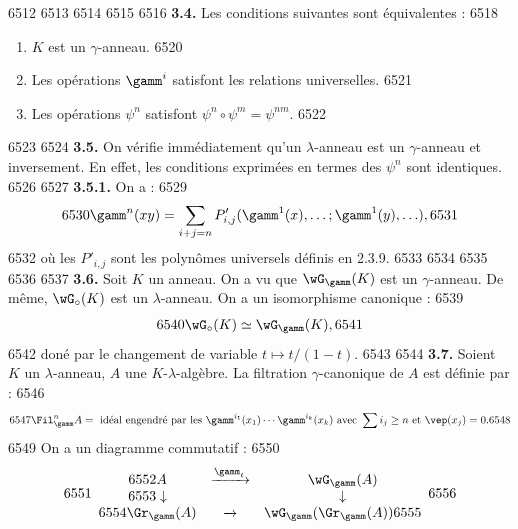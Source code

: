   6512	
  6513	%
  6514	%
  6515	%
  6516		\noindent\textbf{3.4.} Les conditions suivantes sont \'equivalentes :
  6518	\begin{enumerate}
  6519	\item $K$ est un $\gamma$-anneau.
  6520	\item Les op\'erations $\gamm^i$ satisfont les relations universelles.
  6521	\item Les op\'erations $\psi^n$ satisfont $\psi^n \circ \psi^m = \psi^{nm}$.
  6522	\end{enumerate}
  6523	
  6524		\noindent\textbf{3.5.} On v\'erifie imm\'ediatement qu'un $\lambda$-anneau est un $\gamma$-anneau et inversement. En effet, les conditions exprim\'ees en termes des $\psi^n$ sont identiques.
  6526	
  6527		\noindent\textbf{3.5.1.} On a :
  6529	\begin{equation}
  6530	\gamm^n(xy) = \sum_{i+j=n} P'_{i,j}(\gamm^1(x), \ldots; \gamm^1(y), \ldots),
  6531	\end{equation}
  6532	o\`u les $P'_{i,j}$ sont les polyn\^omes universels d\'efinis en 2.3.9.
  6533	
  6534	%
  6535	%
  6536	%
  6537		\noindent\textbf{3.6.} Soit $K$ un anneau. On a vu que $\wG_\gamm(K)$ est un $\gamma$-anneau. De m\^eme, $\wG_\circ(K)$ est un $\lambda$-anneau. On a un isomorphisme canonique :
  6539	\begin{equation}
  6540	\wG_\circ(K) \simeq \wG_\gamm(K),
  6541	\end{equation}
  6542	don\'e par le changement de variable $t \mapsto t/(1-t)$.
  6543	
  6544		\noindent\textbf{3.7.} Soient $K$ un $\lambda$-anneau, $A$ une $K$-$\lambda$-alg\`ebre. La filtration $\gamma$-canonique de $A$ est d\'efinie par :
  6546	\begin{equation}
  6547	\Fil_\gamm^n A = \text{ id\'eal engendr\'e par les } \gamm^{i_1}(x_1) \cdots \gamm^{i_k}(x_k) \text{ avec } \sum i_j \geq n \text{ et } \vep(x_j) = 0.
  6548	\end{equation}
  6549	On a un diagramme commutatif :
  6550	\[
  6551	\begin{array}{ccc}
  6552	A & \xrightarrow{\gamm_t} & \wG_\gamm(A) \\
  6553	\downarrow & & \downarrow \\
  6554	\Gr_\gamm(A) & \xrightarrow{} & \wG_\gamm(\Gr_\gamm(A))
  6555	\end{array}
  6556	\]
